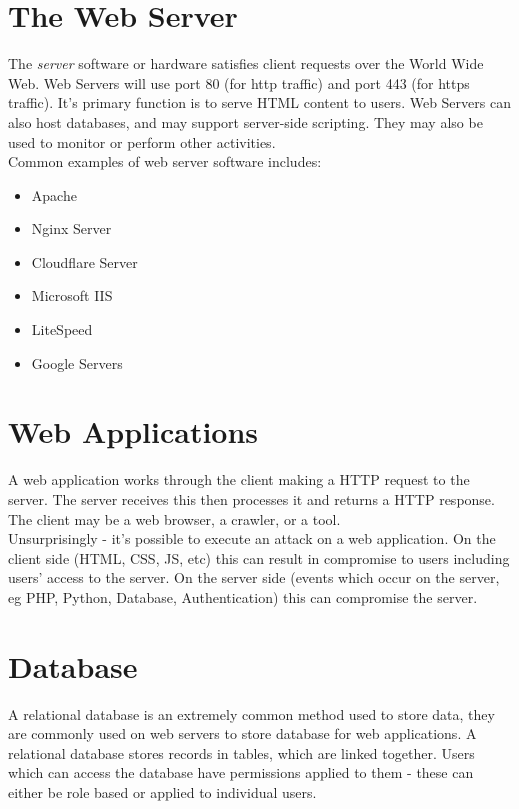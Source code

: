 
\section{The Web Server}
The \textit{server} software or hardware satisfies client requests over the World Wide Web. Web Servers will use port 80 (for http traffic) and port 443 (for https traffic). It's primary function is to serve HTML content to users. Web Servers can also host databases, and may support server-side scripting. They may also be used to monitor or perform other activities.\\

Common examples of web server software includes:
\begin{itemize}
    \item Apache
    \item Nginx Server
    \item Cloudflare Server
    \item Microsoft IIS 
    \item LiteSpeed
    \item Google Servers
\end{itemize}

\section{Web Applications}

A web application works through the client making a HTTP request to the server. The server receives this then processes it and returns a HTTP response. The client may be a web browser, a crawler, or a tool. \\

Unsurprisingly - it's possible to execute an attack on a web application. On the client side (HTML, CSS, JS, etc) this can result in compromise to users including users' access to the server. On the server side (events which occur on the server, eg PHP, Python, Database, Authentication) this can compromise the server.

\section{Database}
A relational database is an extremely common method used to store data, they are commonly used on web servers to store database for web applications. A relational database stores records in tables, which are linked together. Users which can access the database have permissions applied to them - these can either be role based or applied to individual users.

